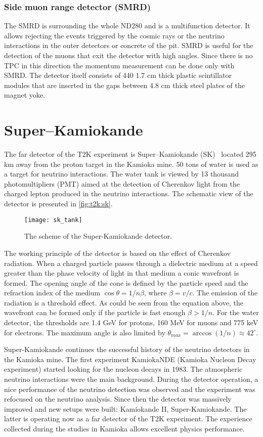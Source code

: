 \documentclass[../main.tex]{subfiles}
\begin{document}
\subsubsection{Side muon range detector (SMRD)}
The SMRD is surrounding the whole ND280 and is a multifunction detector. It allows rejecting the events triggered by the cosmic rays or the neutrino interactions in the outer detectors or concrete of the pit. SMRD is useful for the detection of the muons that exit the detector with high angles. Since there is no TPC in this direction the momentum measurement can be done only with SMRD. The detector itself consists of 440 1.7 cm thick plastic scintillator modules that are inserted in the gaps between 4.8 cm thick steel plates of the magnet yoke.


\section{Super--Kamiokande}
\label{sec:T2K:sk}
The far detector of the T2K experiment is Super--Kamiokande (SK)~\cite{Fukuda2003} located 295 km away from the proton target in the Kamioka mine. 50 tons of water is used as a target for neutrino interactions. The water tank is viewed by 13 thousand photomultipliers (PMT) aimed at the detection of Cherenkov light from the charged lepton produced in the neutrino interactions. The schematic view of the detector is presented in \autoref{fig:t2k:sk}.

\begin{figure}[!ht]
  \centering
  \texttt{[image: sk\_tank]}
  \caption{The scheme of the Super-Kamiokande detector.}
  \label{fig:t2k:sk}
\end{figure}

The working principle of the detector is based on the effect of Cherenkov radiation. When a charged particle passes through a dielectric medium at a speed greater than the phase velocity of light in that medium a conic wavefront is formed. The opening angle of the cone is defined by the particle speed and the refraction index of the medium $\cos{\theta}=1/n\beta$, where $\beta=v/c$. The emission of the radiation is a threshold effect. As could be seen from the equation above, the wavefront can be formed only if the particle is fast enough $\beta>1/n$. For the water detector, the thresholds are 1.4 GeV for protons, 160 MeV for muons and 775 keV for electrons. The maximum angle is also limited by $\theta_{max}=\arccos(1/n)\approx42^\circ$.

Super-Kamiokande continues the successful history of the neutrino detectors in the Kamioka mine. The first experiment KamiokaNDE (Kamioka Nucleon Decay experiment) started looking for the nucleon decays in 1983. The atmospheric neutrino interactions were the main background. During the detector operation, a nice performance of the neutrino detection was observed and the experiment was refocused on the neutrino analysis. Since then the detector was massively improved and new setups were built: Kamiokande II, Super-Kamiokande. The latter is operating now as a far detector of the T2K experiment. The experience collected during the studies in Kamioka allows excellent physics performance.
\end{document}
